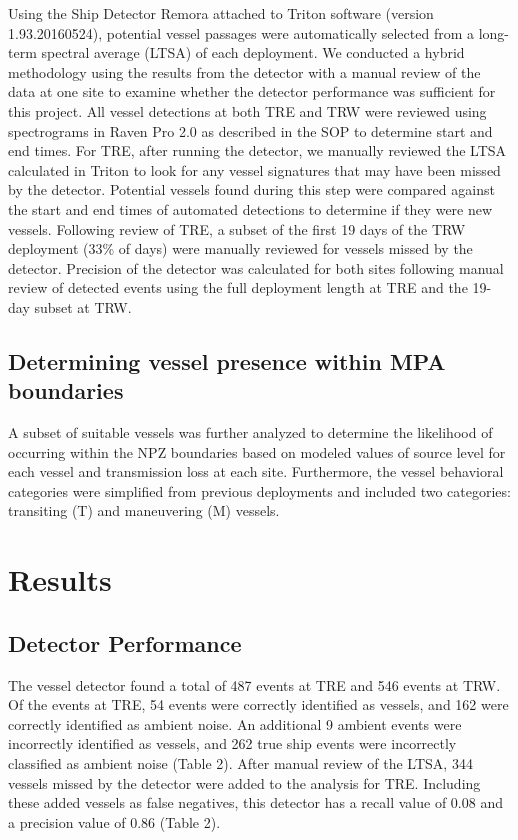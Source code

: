 \documentclass[
  letterpaper,
  oneside,
  open=any]{scrbook}
\begin{document}
Using the Ship Detector Remora attached to Triton software (version
1.93.20160524), potential vessel passages were automatically selected
from a long-term spectral average (LTSA) of each deployment. We
conducted a hybrid methodology using the results from the detector with
a manual review of the data at one site to examine whether the detector
performance was sufficient for this project. All vessel detections at
both TRE and TRW were reviewed using spectrograms in Raven Pro 2.0 as
described in the SOP to determine start and end times. For TRE, after
running the detector, we manually reviewed the LTSA calculated in Triton
to look for any vessel signatures that may have been missed by the
detector. Potential vessels found during this step were compared against
the start and end times of automated detections to determine if they
were new vessels. Following review of TRE, a subset of the first 19 days
of the TRW deployment (33\% of days) were manually reviewed for vessels
missed by the detector. Precision of the detector was calculated for
both sites following manual review of detected events using the full
deployment length at TRE and the 19-day subset at TRW.

\section{Determining vessel presence within MPA
boundaries}\label{determining-vessel-presence-within-mpa-boundaries}

A subset of suitable vessels was further analyzed to determine the
likelihood of occurring within the NPZ boundaries based on modeled
values of source level for each vessel and transmission loss at each
site. Furthermore, the vessel behavioral categories were simplified from
previous deployments and included two categories: transiting (T) and
maneuvering (M) vessels.


\chapter{Results}\label{results}

\section{Detector Performance}\label{detector-performance}

The vessel detector found a total of 487 events at TRE and 546 events at
TRW. Of the events at TRE, 54 events were correctly identified as
vessels, and 162 were correctly identified as ambient noise. An
additional 9 ambient events were incorrectly identified as vessels, and
262 true ship events were incorrectly classified as ambient noise (Table
2). After manual review of the LTSA, 344 vessels missed by the detector
were added to the analysis for TRE. Including these added vessels as
false negatives, this detector has a recall value of 0.08 and a
precision value of 0.86 (Table 2).
\end{document}
